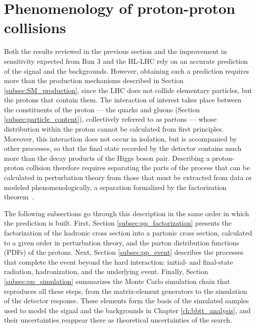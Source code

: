 \section{Phenomenology of proton-proton collisions}   
\label{sec:pp_pheno}
% 
Both the results reviewed in the previous section and the improvement in sensitivity expected from Run 3 and the HL-LHC rely on an accurate prediction of the signal and the backgrounds. However, obtaining such a prediction requires more than the production mechanisms described in Section \ref{subsec:SM_production}, since the LHC does not collide elementary particles, but the protons that contain them. The interaction of interest takes place between the constituents of the proton — the quarks and gluons (Section \ref{subsec:particle_content}), collectively referred to as partons — whose distribution within the proton cannot be calculated from first principles. Moreover, this interaction does not occur in isolation, but is accompanied by other processes, so that the final state recorded by the detector contains much more than the decay products of the Higgs boson pair. Describing a proton-proton collision therefore requires separating the parts of the process that can be calculated in perturbation theory from those that must be extracted from data or modeled phenomenologically, a separation formalized by the factorization theorem~\cite{Collins:1989gx}.




The following subsections go through this description in the same order in which the prediction is built. First, Section \ref{subsec:pp_factorization} presents the factorization of the hadronic cross section into a partonic cross section, calculated to a given order in perturbation theory, and the parton distribution functions (PDFs) of the protons. Next, Section \ref{subsec:pp_event} describes the processes that complete the event beyond the hard interaction: initial- and final-state radiation, hadronization, and the underlying event. Finally, Section \ref{subsec:pp_simulation} summarizes the Monte Carlo simulation chain that reproduces all these steps, from the matrix-element generators to the simulation of the detector response. These elements form the basis of the simulated samples used to model the signal and the backgrounds in Chapter \ref{ch:bbtt_analysis}, and their uncertainties reappear there as theoretical uncertainties of the search.

